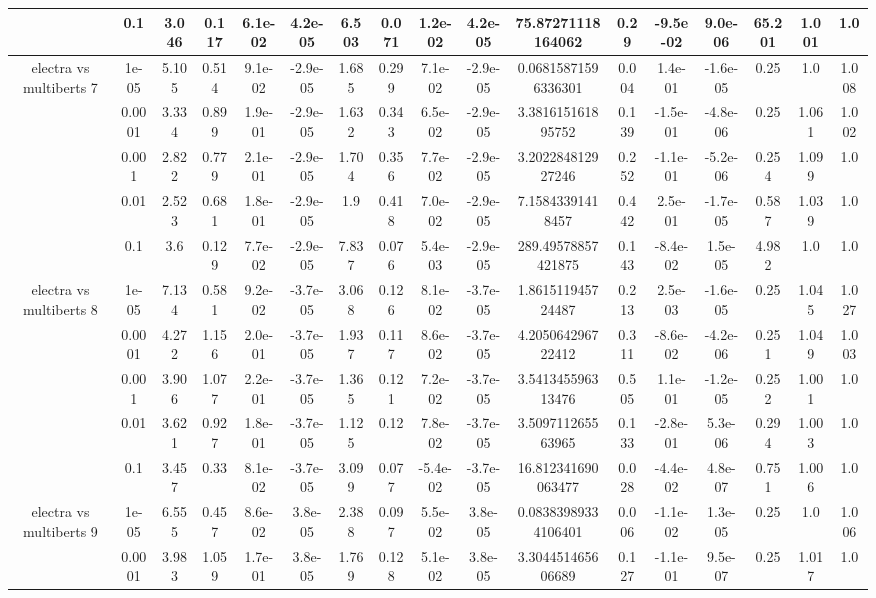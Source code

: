 \begin{tabular}{|c|c|c|c|c|c|c|c|c|c|c|c|c|c|c|c|c|}
 & 0.1 & 3.046 & 0.117 & 6.1e-02 & 4.2e-05 & 6.503 & 0.071 & 1.2e-02 & 4.2e-05 & 75.87271118164062 & 0.29 & -9.5e-02 & 9.0e-06 & 65.201 & 1.001 & 1.0 \\
\hline
\multirow{5}{*}{electra  vs multiberts 7} & 1e-05 & 5.105 & 0.514 & 9.1e-02 & -2.9e-05 & 1.685 & 0.299 & 7.1e-02 & -2.9e-05 & 0.06815871596336301 & 0.004 & 1.4e-01 & -1.6e-05 & 0.25 & 1.0 & 1.008 \\
 & 0.0001 & 3.334 & 0.899 & 1.9e-01 & -2.9e-05 & 1.632 & 0.343 & 6.5e-02 & -2.9e-05 & 3.381615161895752 & 0.139 & -1.5e-01 & -4.8e-06 & 0.25 & 1.061 & 1.002 \\
 & 0.001 & 2.822 & 0.779 & 2.1e-01 & -2.9e-05 & 1.704 & 0.356 & 7.7e-02 & -2.9e-05 & 3.202284812927246 & 0.252 & -1.1e-01 & -5.2e-06 & 0.254 & 1.099 & 1.0 \\
 & 0.01 & 2.523 & 0.681 & 1.8e-01 & -2.9e-05 & 1.9 & 0.418 & 7.0e-02 & -2.9e-05 & 7.15843391418457 & 0.442 & 2.5e-01 & -1.7e-05 & 0.587 & 1.039 & 1.0 \\
 & 0.1 & 3.6 & 0.129 & 7.7e-02 & -2.9e-05 & 7.837 & 0.076 & 5.4e-03 & -2.9e-05 & 289.49578857421875 & 0.143 & -8.4e-02 & 1.5e-05 & 4.982 & 1.0 & 1.0 \\
\hline
\multirow{5}{*}{electra  vs multiberts 8} & 1e-05 & 7.134 & 0.581 & 9.2e-02 & -3.7e-05 & 3.068 & 0.126 & 8.1e-02 & -3.7e-05 & 1.861511945724487 & 0.213 & 2.5e-03 & -1.6e-05 & 0.25 & 1.045 & 1.027 \\
 & 0.0001 & 4.272 & 1.156 & 2.0e-01 & -3.7e-05 & 1.937 & 0.117 & 8.6e-02 & -3.7e-05 & 4.205064296722412 & 0.311 & -8.6e-02 & -4.2e-06 & 0.251 & 1.049 & 1.003 \\
 & 0.001 & 3.906 & 1.077 & 2.2e-01 & -3.7e-05 & 1.365 & 0.121 & 7.2e-02 & -3.7e-05 & 3.541345596313476 & 0.505 & 1.1e-01 & -1.2e-05 & 0.252 & 1.001 & 1.0 \\
 & 0.01 & 3.621 & 0.927 & 1.8e-01 & -3.7e-05 & 1.125 & 0.12 & 7.8e-02 & -3.7e-05 & 3.509711265563965 & 0.133 & -2.8e-01 & 5.3e-06 & 0.294 & 1.003 & 1.0 \\
 & 0.1 & 3.457 & 0.33 & 8.1e-02 & -3.7e-05 & 3.099 & 0.077 & -5.4e-02 & -3.7e-05 & 16.812341690063477 & 0.028 & -4.4e-02 & 4.8e-07 & 0.751 & 1.006 & 1.0 \\
\hline
\multirow{5}{*}{electra  vs multiberts 9} & 1e-05 & 6.555 & 0.457 & 8.6e-02 & 3.8e-05 & 2.388 & 0.097 & 5.5e-02 & 3.8e-05 & 0.08383989334106401 & 0.006 & -1.1e-02 & 1.3e-05 & 0.25 & 1.0 & 1.006 \\
 & 0.0001 & 3.983 & 1.059 & 1.7e-01 & 3.8e-05 & 1.769 & 0.128 & 5.1e-02 & 3.8e-05 & 3.304451465606689 & 0.127 & -1.1e-01 & 9.5e-07 & 0.25 & 1.017 & 1.0 \\

\end{tabular}
